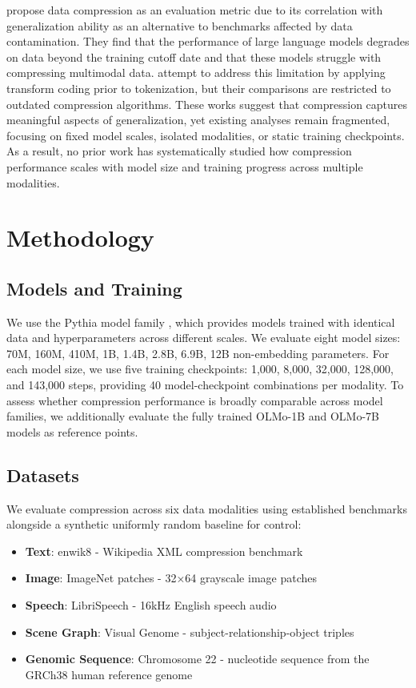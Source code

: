 \documentclass[10pt]{article} %
\begin{document}
\citet{li2024llmzip} propose data compression as an evaluation metric due to its correlation with generalization ability as an alternative to benchmarks affected by data contamination. They find that the performance of large language models degrades on data beyond the training cutoff date and that these models struggle with compressing multimodal data. \citet{zhang2025llmzip} attempt to address this limitation by applying transform coding prior to tokenization, but their comparisons are restricted to outdated compression algorithms. These works suggest that compression captures meaningful aspects of generalization, yet existing analyses remain fragmented, focusing on fixed model scales, isolated modalities, or static training checkpoints. As a result, no prior work has systematically studied how compression performance scales with model size and training progress across multiple modalities.

\section{Methodology}
\subsection{Models and Training}

We use the Pythia model family \citep{biderman2023pythia}, which provides models trained with identical data and hyperparameters across different scales. We evaluate eight model sizes: 70M, 160M, 410M, 1B, 1.4B, 2.8B, 6.9B, 12B non-embedding parameters. For each model size, we use five training checkpoints: 1,000, 8,000, 32,000, 128,000, and 143,000 steps, providing 40 model-checkpoint combinations per modality. To assess whether compression performance is broadly comparable across model families, we additionally evaluate the fully trained OLMo-1B and OLMo-7B models as reference points.

\subsection{Datasets}

We evaluate compression across six data modalities using established benchmarks alongside a synthetic uniformly random baseline for control:
\begin{itemize}
\item \textbf{Text}: enwik8 - Wikipedia XML compression benchmark
\item \textbf{Image}: ImageNet patches - 32×64 grayscale image patches  
\item \textbf{Speech}: LibriSpeech - 16kHz English speech audio
\item \textbf{Scene Graph}: Visual Genome - subject-relationship-object triples
\item \textbf{Genomic Sequence}: Chromosome 22 - nucleotide sequence from the GRCh38 human reference genome

\end{itemize}
\end{document}
